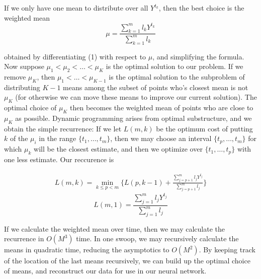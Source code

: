 \documentclass{article}
\begin{document}
If we only have one mean to distribute over all $Y^{t_k}$, then the best choice is the weighted mean
%
\[ \mu = \frac{\sum_{k = 1}^m l_k Y^{t_k}}{\sum_{k = 1}^m l_k} \]
%

obtained by differentiating (1) with respect to $\mu$, and simplifying the formula. Now suppose $\mu_1 < \mu_2 < \dots < \mu_K$ is the optimal solution to our problem. If we remove $\mu_K$, then $\mu_1 < \dots < \mu_{K-1}$ is the optimal solution to the subproblem of distributing $K-1$ means among the subset of points who's closest mean is not $\mu_K$ (for otherwise we can move these means to improve our current solution). The optimal choice of $\mu_K$ then becomes the weighted mean of points who are close to $\mu_K$ as possible. Dynamic programming arises from optimal substructure, and we obtain the simple recurrence: If we let $L(m,k)$ be the optimum cost of putting $k$ of the $\mu_i$ in the range $\{ t_1, \dots, t_m \}$, then we may choose an interval $\{ t_p, \dots, t_m \}$ for which $\mu_k$ will be the closest estimate, and then we optimize over $\{ t_1, \dots, t_p \}$ with one less estimate. Our reccurence is

%
\begin{align*}
    L(m,k) = \min_{k \leq p < m} \bigg\{ L(p,k-1) + \frac{\sum_{j = p+1}^m l_j Y^{t_j}}{\sum_{j = p+1}^m l_j} \bigg\}
\end{align*}
%
\[ L(m,1) = \frac{\sum_{j = 1}^m l_j Y^{t_j}}{\sum_{j = 1}^m l_j} \]
%

If we calculate the weighted mean over time, then we may calculate the recurrence in $O(M^3)$ time. In one swoop, we may recursively calculate the means in quadratic time, reducing the asymptotics to $O(M^2)$. By keeping track of the location of the last means recursively, we can build up the optimal choice of means, and reconstruct our data for use in our neural network.

\end{document}
